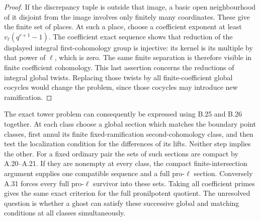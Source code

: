 \begin{proof}
If the discrepancy tuple is outside that image, a basic open
neighbourhood of it disjoint from the image involves only finitely
many coordinates. These give the finite set of places. At such a
place, choose a coefficient exponent at least
$v_\ell(q^{r+1}-1)$. The coefficient exact sequence shows that
reduction of the displayed integral first-cohomology group is
injective: its kernel is its multiple by that power of $\ell$,
which is zero. The same finite separation is therefore visible in
finite coefficient cohomology. This last assertion concerns the
reductions of integral global twists. Replacing those twists by all
finite-coefficient global cocycles would change the problem, since
those cocycles may introduce new ramification.
\end{proof}

The exact tower problem can consequently be expressed using B.25
and B.26 together. At each class choose a global section which
matches the boundary point classes, first annul its finite
fixed-ramification second-cohomology class, and then test the
localization condition for the differences of its lifts. Neither
step implies the other. For a fixed ordinary pair the sets of such
sections are compact by A.20--A.21. If they are nonempty at every
class, the compact finite-intersection argument supplies one
compatible sequence and a full pro-$\ell$ section. Conversely
A.31 forces every full pro-$\ell$ survivor into these sets. Taking
all coefficient primes gives the same exact criterion for the full
pronilpotent quotient. The unresolved question is whether a ghost
can satisfy these successive global and matching conditions at all
classes simultaneously.
